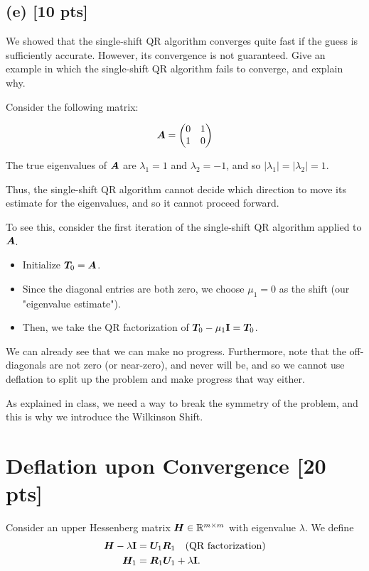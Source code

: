 \documentclass[twoside,10pt]{article}
\begin{document}
  \subsection*{(e) [10 pts]}
  We showed that the single-shift QR algorithm converges quite fast if the guess is sufficiently accurate. 
  However, its convergence is not guaranteed.
  Give an example in which the single-shift QR algorithm fails to converge, and explain why.

\quad Consider the following matrix:

$$\bm{A} = \begin{pmatrix}
  0 & 1 \\
  1 & 0
\end{pmatrix}$$

The true eigenvalues of $\bm{A}$ are $\lambda_1 = 1$ and $\lambda_2 = -1$, and so $\left|\lambda_1\right| = \left|\lambda_2\right| = 1$.

Thus, the single-shift QR algorithm cannot decide which direction to move its estimate for the eigenvalues, and so it cannot proceed forward.

To see this, consider the first iteration of the single-shift QR algorithm applied to $\bm{A}$.

\begin{itemize}
\item Initialize $\bm{T}_0 = \bm{A}$.
\item Since the diagonal entries are both zero, we choose $\mu_1 = 0$ as the shift (our "eigenvalue estimate").
\item Then, we take the QR factorization of $\bm{T}_0 - \mu_1 \mathbf{I} = \bm{T}_0$.
\end{itemize}

We can already see that we can make no progress.
Furthermore, note that the off-diagonals are not zero (or near-zero), and never will be, and so we cannot use deflation to split up the problem and make progress that way either.

As explained in class, we need a way to break the symmetry of the problem, and this is why we introduce the Wilkinson Shift.

\section{Deflation upon Convergence [20 pts]}
Consider an upper Hessenberg matrix $\bm{H} \in \mathbb{R}^{m \times m}$ with eigenvalue $\lambda$. 
We define 
\begin{align}
  \bm{H} - \lambda \mathbf{I} &= \bm{U}_1 \bm{R}_1 \quad \text{(QR factorization)} \\ 
  \bm{H}_1 &= \bm{R}_1 \bm{U}_1 + \lambda \mathbf{I}.
\end{align}
\end{document}
